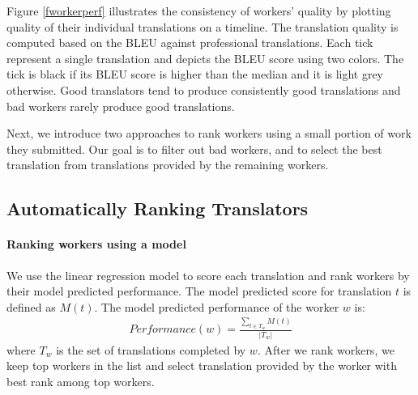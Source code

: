 \documentclass[11pt,letterpaper]{article}
\begin{document}
Figure \ref{fworkerperf} illustrates the consistency of workers' quality by plotting quality of their individual translations on a timeline. The translation quality is computed based on the BLEU against professional translations. Each tick represent a single translation and depicts the BLEU score using two colors. The tick is black if its BLEU score is higher than the median and it is light grey otherwise. Good translators tend to produce consistently good translations and bad workers rarely produce good translations.


Next, we introduce two approaches to rank workers using a small portion of work they submitted.  Our goal is to filter out bad workers, and to select the best translation from translations provided by the remaining workers.

\subsection{Automatically Ranking Translators}




\paragraph{Ranking workers using a model}
We use the linear regression model to score each translation and rank workers by their model predicted performance.  
The model predicted score for translation $t$ is defined as $M(t)$. The model predicted performance of the worker $w$ is:
\begin{align*}
Performance(w) = \frac{\sum_{t \in T_{w}} M (t)}{|T_{w}|}
 \end{align*}
 where $T_{w} $ is the set of translations completed by $w$. 
After we rank workers, we keep top workers in the list and select translation provided by the worker with best rank among top workers.
\end{document}
